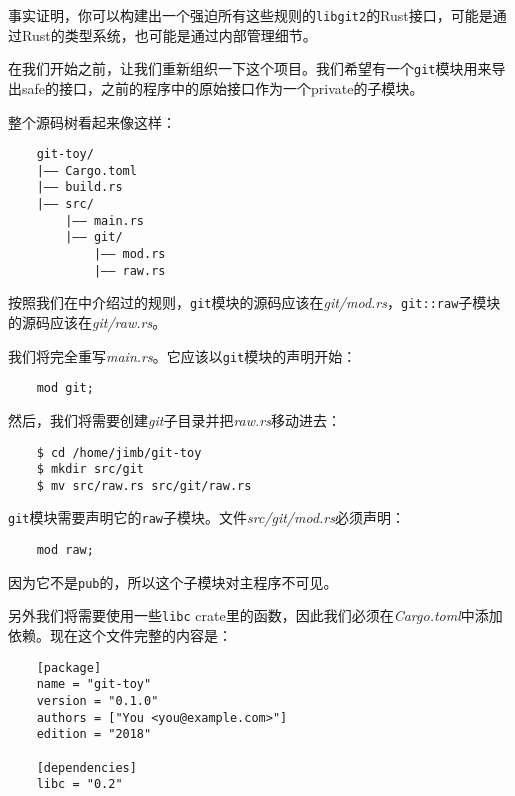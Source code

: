 事实证明，你可以构建出一个强迫所有这些规则的\texttt{libgit2}的Rust接口，可能是通过Rust的类型系统，也可能是通过内部管理细节。

在我们开始之前，让我们重新组织一下这个项目。我们希望有一个\texttt{git}模块用来导出safe的接口，之前的程序中的原始接口作为一个private的子模块。

整个源码树看起来像这样：
\begin{verbatim}
    git-toy/
    |—— Cargo.toml
    |—— build.rs
    |—— src/
        |—— main.rs
        |—— git/
            |—— mod.rs
            |—— raw.rs
\end{verbatim}

按照我们在中介绍过的规则，\texttt{git}模块的源码应该在\emph{git/mod.rs}，\texttt{git::raw}子模块的源码应该在\emph{git/raw.rs}。

我们将完全重写\emph{main.rs}。它应该以\texttt{git}模块的声明开始：
\begin{verbatim}
    mod git;
\end{verbatim}

然后，我们将需要创建\emph{git}子目录并把\emph{raw.rs}移动进去：
\begin{verbatim}
    $ cd /home/jimb/git-toy
    $ mkdir src/git
    $ mv src/raw.rs src/git/raw.rs
\end{verbatim}

\texttt{git}模块需要声明它的\texttt{raw}子模块。文件\emph{src/git/mod.rs}必须声明：
\begin{verbatim}
    mod raw;
\end{verbatim}

因为它不是\texttt{pub}的，所以这个子模块对主程序不可见。

另外我们将需要使用一些\texttt{libc} crate里的函数，因此我们必须在\emph{Cargo.toml}中添加依赖。现在这个文件完整的内容是：
\begin{verbatim}
    [package]
    name = "git-toy"
    version = "0.1.0"
    authors = ["You <you@example.com>"]
    edition = "2018"

    [dependencies]
    libc = "0.2"
\end{verbatim}

